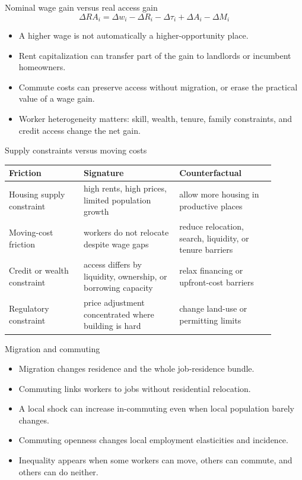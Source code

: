 \documentclass[aspectratio=169,11pt]{beamer}
\begin{document}
\begin{frame}{Nominal wage gain versus real access gain}
\[
\Delta RA_i = \Delta w_i - \Delta R_i - \Delta \tau_i + \Delta A_i - \Delta M_i
\]
\begin{itemize}
    \item A higher wage is not automatically a higher-opportunity place.
    \item Rent capitalization can transfer part of the gain to landlords or incumbent homeowners.
    \item Commute costs can preserve access without migration, or erase the practical value of a wage gain.
    \item Worker heterogeneity matters: skill, wealth, tenure, family constraints, and credit access change the net gain.
\end{itemize}
\end{frame}

\begin{frame}{Supply constraints versus moving costs}
\small
\begin{tabular}{p{0.25\linewidth} p{0.32\linewidth} p{0.32\linewidth}}
\toprule
Friction & Signature & Counterfactual \\
\midrule
Housing supply constraint & high rents, high prices, limited population growth & allow more housing in productive places \\
Moving-cost friction & workers do not relocate despite wage gaps & reduce relocation, search, liquidity, or tenure barriers \\
Credit or wealth constraint & access differs by liquidity, ownership, or borrowing capacity & relax financing or upfront-cost barriers \\
Regulatory constraint & price adjustment concentrated where building is hard & change land-use or permitting limits \\
\bottomrule
\end{tabular}
\end{frame}

\begin{frame}{Migration and commuting}
\begin{itemize}
    \item Migration changes residence and the whole job-residence bundle.
    \item Commuting links workers to jobs without residential relocation.
    \item A local shock can increase in-commuting even when local population barely changes.
    \item Commuting openness changes local employment elasticities and incidence.
    \item Inequality appears when some workers can move, others can commute, and others can do neither.
\end{itemize}
\end{frame}
\end{document}
